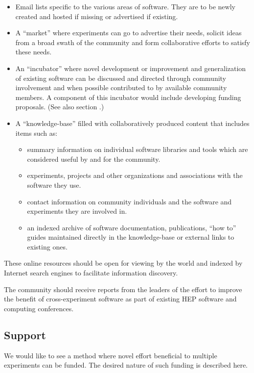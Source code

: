 \begin{itemize}
\item Email lists specific to the various areas of software.  They are to be
  newly created and hosted if missing or advertised if existing.
\item A ``market'' where experiments can go to advertise their needs,
  solicit ideas from a broad swath of the community and form 
  collaborative efforts to satisfy these needs.
\item An ``incubator'' where novel development or improvement and
  generalization of existing software can be discussed and directed
  through community involvement and when possible contributed to by
  available community members.  A component of this incubator would
  include developing funding proposals.  (See also section \label{sec:support}.)
\item A ``knowledge-base'' filled with collaboratively produced content
  that includes items such as:
  \begin{itemize}
  \item summary information on individual software libraries and tools
    which are considered useful by and for the community.
  \item experiments, projects and other organizations and associations with the software they use.
  \item contact information on community individuals and the software
    and experiments they are involved in.
  \item an indexed archive of software documentation, publications,
    ``how to'' guides maintained directly in the knowledge-base or 
    external links to existing ones.
  \end{itemize}
\end{itemize}

\noindent These online resources should be open for viewing by the world and
indexed by Internet search engines to facilitate information
discovery.

The community should receive reports from the leaders of the effort to
improve the benefit of cross-experiment software as part of existing
HEP software and computing conferences.


\subsection{Support}
\label{sec:support}

We would like to see a method where novel effort beneficial to
multiple experiments can be funded.  The desired nature of such
funding is described here.

